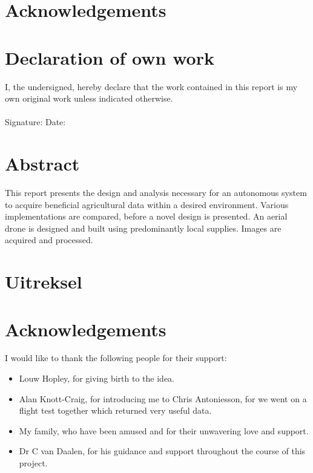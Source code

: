 \newpage
\section*{Acknowledgements}
\section*{Declaration of own work}

I, the undersigned, hereby declare that the work contained in this report is my own original work
unless indicated otherwise.\\\\

\noindent
Signature: \underline{ }\underline{ }\underline{ } Date: \underline{ }\underline{ }\underline{ }

\section*{Abstract}

This report presents the design and analysis necessary for an autonomous system to acquire beneficial agricultural data within a desired environment. Various implementations are compared, before a novel design is presented. An aerial drone is designed and built using predominantly local supplies. Images are acquired and processed.

\section*{Uitreksel}

\section*{Acknowledgements}

I would like to thank the following people for their support:
\begin{itemize}
    \item Louw Hopley, for giving birth to the idea.
    \item Alan Knott-Craig, for introducing me to Chris Antoniesson, for we went on a flight test together which returned very useful data.
    \item My family, who have been amused and for their unwavering love and support.
    \item Dr C van Daalen, for his guidance and support throughout the course of this project.
\end{itemize}


